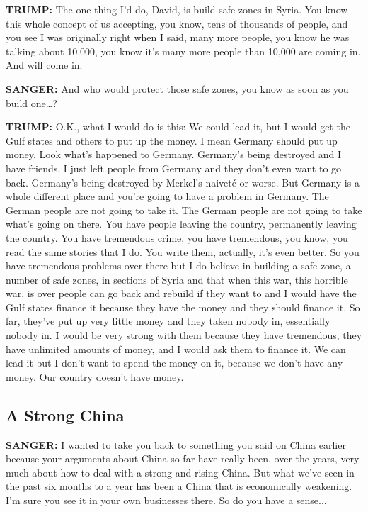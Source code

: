 \textbf{TRUMP:} The one thing I'd do, David, is build safe zones in
Syria. You know this whole concept of us accepting, you know, tens of
thousands of people, and you see I was originally right when I said,
many more people, you know he was talking about 10,000, you know it's
many more people than 10,000 are coming in. And will come in.

\textbf{SANGER:} And who would protect those safe zones, you know as
soon as you build one\ldots{}?

\textbf{TRUMP:} O.K., what I would do is this: We could lead it, but I
would get the Gulf states and others to put up the money. I mean Germany
should put up money. Look what's happened to Germany. Germany's being
destroyed and I have friends, I just left people from Germany and they
don't even want to go back. Germany's being destroyed by Merkel's
naiveté or worse. But Germany is a whole different place and you're
going to have a problem in Germany. The German people are not going to
take it. The German people are not going to take what's going on there.
You have people leaving the country, permanently leaving the country.
You have tremendous crime, you have tremendous, you know, you read the
same stories that I do. You write them, actually, it's even better. So
you have tremendous problems over there but I do believe in building a
safe zone, a number of safe zones, in sections of Syria and that when
this war, this horrible war, is over people can go back and rebuild if
they want to and I would have the Gulf states finance it because they
have the money and they should finance it. So far, they've put up very
little money and they taken nobody in, essentially nobody in. I would be
very strong with them because they have tremendous, they have unlimited
amounts of money, and I would ask them to finance it. We can lead it but
I don't want to spend the money on it, because we don't have any money.
Our country doesn't have money.

\hypertarget{a-strong-china}{%
\subsection{A Strong China}\label{a-strong-china}}

\textbf{SANGER:} I wanted to take you back to something you said on
China earlier because your arguments about China so far have really
been, over the years, very much about how to deal with a strong and
rising China. But what we've seen in the past six months to a year has
been a China that is economically weakening. I'm sure you see it in your
own businesses there. So do you have a sense...

